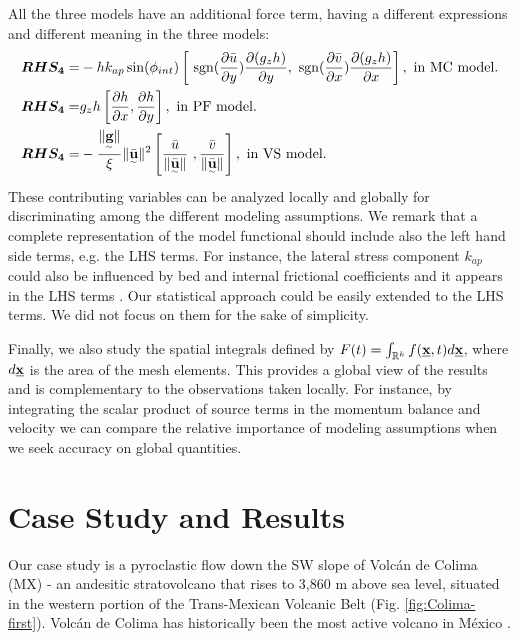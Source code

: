 \documentclass{article}
\begin{document}
All the three models have an additional force term, having a different expressions and different meaning in the three models:
\begin{align}
\boldsymbol{RHS_4} =&  - h k_{ap}\sin(\phi_{int})\left[ \ {\rm sgn}(\frac{\partial \bar{u}}{\partial y}) \frac{\partial (g_z h)}{\partial y},\ {\rm sgn}({\frac{\partial \bar{v}}{\partial x}}) \frac{\partial (g_z h)}{\partial x}\right],\textmd{ in MC model.}\nonumber\\
\boldsymbol{RHS_4} =& g_{z}h\left[\frac{\partial h}{\partial x}, \frac{\partial h}{\partial y}\right],\textmd{ in PF model.}\\
\boldsymbol{RHS_4} =& -\frac{\| \underset{^\sim}{\textbf g} \|}{\xi}\| \underset{^\sim}{\bar{\textbf u}} \|^2\left[\frac{\bar{u}}{\| \underset{^\sim}{\bar{\textbf u}}\|} \ ,\frac{\bar{v}}{\| \underset{^\sim}{\bar{\textbf u}}\|}\right],\textmd{ in VS model.}\nonumber
\end{align}
These contributing variables can be analyzed locally and globally for discriminating among the different modeling assumptions. We remark that a complete representation of the model functional should include also the left hand side terms, e.g. the LHS terms. For instance, the lateral stress component $k_{ap}$ could also be influenced by bed and internal frictional coefficients and it appears in the LHS terms \citep{Gray1999,Pirulli2007}. Our statistical approach could be easily extended to the LHS terms. We did not focus on them for the sake of simplicity.

Finally, we also study the spatial integrals defined by $F(t)=\int_{\mathbb R^k}f(\underline{\textbf x},t) d\underline{\textbf x}$, where $d\underline{\textbf x}$ is the area of the mesh elements. This provides a global view of the results and is complementary to the observations taken locally. For instance, by integrating the scalar product of source terms in the momentum balance and velocity we can compare the relative importance of modeling assumptions when we seek accuracy on global quantities.

\section{Case Study and Results}\label{QoI2}
Our case study is a pyroclastic flow down the SW slope of Volc{\'a}n de Colima (MX) - an andesitic stratovolcano that rises to 3,860 m above sea level, situated in the western portion of the Trans-Mexican Volcanic Belt (Fig. \ref{fig:Colima-first}). Volc{\'a}n de Colima has historically been the most active volcano in M{\'e}xico \citep{DeLaCruzReina1993, Zobin2002, Gonzalez2002}.
\end{document}
